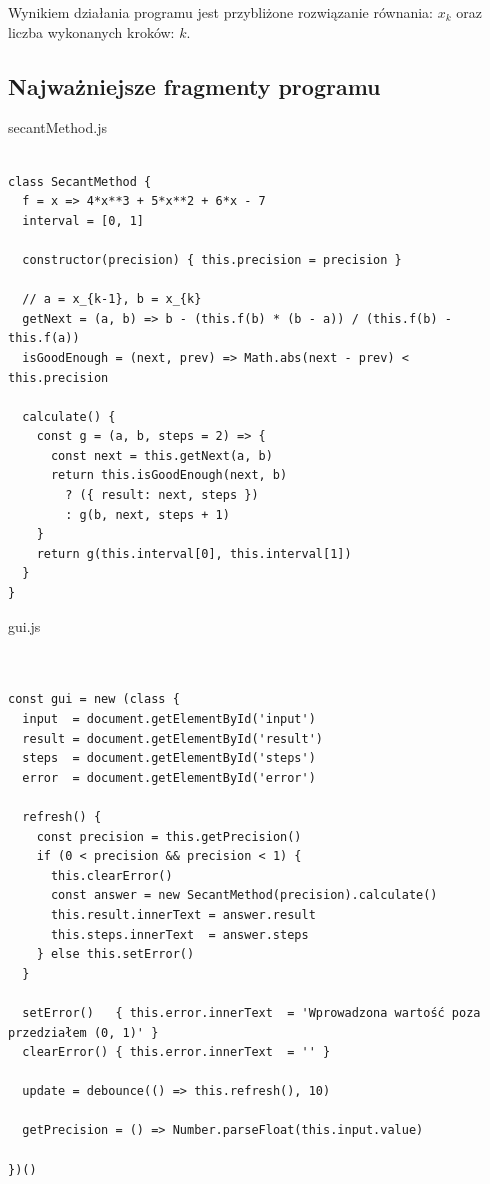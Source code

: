 \documentclass[12pt]{article}
\begin{document}
Wynikiem działania programu jest przybliżone rozwiązanie równania: $x_k$ oraz liczba wykonanych kroków: $k$.
\newpage
\subsection{Najważniejsze fragmenty programu}
secantMethod.js
\begin{verbatim}

class SecantMethod {
  f = x => 4*x**3 + 5*x**2 + 6*x - 7
  interval = [0, 1]

  constructor(precision) { this.precision = precision }

  // a = x_{k-1}, b = x_{k}
  getNext = (a, b) => b - (this.f(b) * (b - a)) / (this.f(b) - this.f(a))
  isGoodEnough = (next, prev) => Math.abs(next - prev) < this.precision

  calculate() {
    const g = (a, b, steps = 2) => {
      const next = this.getNext(a, b)
      return this.isGoodEnough(next, b)
        ? ({ result: next, steps })
        : g(b, next, steps + 1)
    }
    return g(this.interval[0], this.interval[1])
  }
}

\end{verbatim}
\newpage
gui.js
\begin{verbatim}


const gui = new (class {
  input  = document.getElementById('input')
  result = document.getElementById('result')
  steps  = document.getElementById('steps')
  error  = document.getElementById('error')

  refresh() {
    const precision = this.getPrecision()
    if (0 < precision && precision < 1) {
      this.clearError()
      const answer = new SecantMethod(precision).calculate()
      this.result.innerText = answer.result
      this.steps.innerText  = answer.steps
    } else this.setError()
  }

  setError()   { this.error.innerText  = 'Wprowadzona wartość poza przedziałem (0, 1)' }
  clearError() { this.error.innerText  = '' }

  update = debounce(() => this.refresh(), 10)

  getPrecision = () => Number.parseFloat(this.input.value)

})()
\end{verbatim}
\newpage
\end{document}
